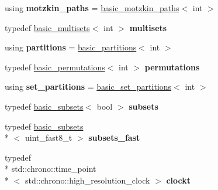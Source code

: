 \begin{DoxyCompactItemize}
\item 
\hypertarget{namespacedscr_a9a5f562c0e10ba4a56a9b415789517f7}{using {\bfseries motzkin\-\_\-paths} = \hyperlink{classdscr_1_1basic__motzkin__paths}{basic\-\_\-motzkin\-\_\-paths}$<$ int $>$}\label{namespacedscr_a9a5f562c0e10ba4a56a9b415789517f7}

\item 
\hypertarget{namespacedscr_a9fb85b7fa706721fa7ad18509bf1564d}{typedef \hyperlink{classdscr_1_1basic__multisets}{basic\-\_\-multisets}$<$ int $>$ {\bfseries multisets}}\label{namespacedscr_a9fb85b7fa706721fa7ad18509bf1564d}

\item 
\hypertarget{namespacedscr_a31f6bc4c39ebc17b98f20c4eeaede0a3}{using {\bfseries partitions} = \hyperlink{classdscr_1_1basic__partitions}{basic\-\_\-partitions}$<$ int $>$}\label{namespacedscr_a31f6bc4c39ebc17b98f20c4eeaede0a3}

\item 
\hypertarget{namespacedscr_a9e61754e725e663b0f40bbfff8bafcfc}{typedef \hyperlink{classdscr_1_1basic__permutations}{basic\-\_\-permutations}$<$ int $>$ {\bfseries permutations}}\label{namespacedscr_a9e61754e725e663b0f40bbfff8bafcfc}

\item 
\hypertarget{namespacedscr_a8c7359f0e3fd2527d8d1a9238ccb2299}{using {\bfseries set\-\_\-partitions} = \hyperlink{classdscr_1_1basic__set__partitions}{basic\-\_\-set\-\_\-partitions}$<$ int $>$}\label{namespacedscr_a8c7359f0e3fd2527d8d1a9238ccb2299}

\item 
\hypertarget{namespacedscr_aa55af7426ea06b63ae05871bda088651}{typedef \hyperlink{classdscr_1_1basic__subsets}{basic\-\_\-subsets}$<$ bool $>$ {\bfseries subsets}}\label{namespacedscr_aa55af7426ea06b63ae05871bda088651}

\item 
\hypertarget{namespacedscr_ab2f40020ed8d272641a762cc88e5f6d6}{typedef \hyperlink{classdscr_1_1basic__subsets}{basic\-\_\-subsets}\\*
$<$ uint\-\_\-fast8\-\_\-t $>$ {\bfseries subsets\-\_\-fast}}\label{namespacedscr_ab2f40020ed8d272641a762cc88e5f6d6}

\item 
\hypertarget{namespacedscr_a1b3465ad982bf9626244c6068ae9e2e8}{typedef \\*
std\-::chrono\-::time\-\_\-point\\*
$<$ std\-::chrono\-::high\-\_\-resolution\-\_\-clock $>$ {\bfseries clockt}}\label{namespacedscr_a1b3465ad982bf9626244c6068ae9e2e8}


\end{DoxyCompactItemize}
